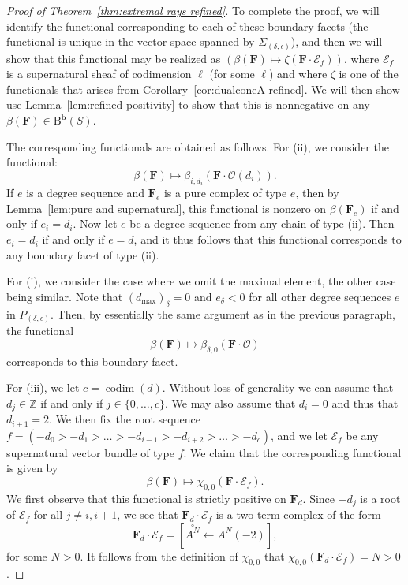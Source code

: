 \documentclass[12pt]{amsart}
\theoremstyle{definition}
\theoremstyle{remark}
\newcommand{\codim}{\operatorname{codim}}
\newcommand{\ZZ}{\mathbb{Z}}
\newcommand{\bb}{\mathbf{b}}
\newcommand{\cO}{\mathcal{O}}
\newcommand{\cE}{\mathcal{E}}
\newcommand{\FF}{\mathbf{F}}
\newcommand{\BBQ}{\mathrm{B}}
\begin{document}
\begin{proof}[Proof of Theorem~\ref{thm:extremal rays refined}]
To complete the proof, we will identify the functional corresponding to each of these boundary facets (the functional is unique in the vector space spanned by $\Sigma_{(\delta,\epsilon)}$), and then we will show that this functional may be realized as $(\beta(\FF)\mapsto \zeta(\FF\cdot \cE_f))$, where $\cE_f$ is a supernatural sheaf of codimension $\ell$ (for some $\ell$) and where $\zeta$ is one of the functionals that arises from Corollary~\ref{cor:dualconeA refined}.   We will then show use Lemma~\ref{lem:refined positivity} to show that  this is nonnegative on any $\beta(\FF)\in \BBQ^{\bb}(S)$.


The corresponding functionals are obtained as follows.  For (ii), we consider the functional:
\[
\beta(\FF)\mapsto \beta_{i,{d_i}}(\FF\cdot \cO(d_i)).
\]
If $e$ is a degree sequence and $\FF_e$ is a pure complex of type $e$, then by Lemma~\ref{lem:pure and supernatural}, this functional is nonzero on $\beta(\FF_e)$ if and only if $e_i=d_i$.
Now let $e$ be a degree sequence from any chain of type (ii).  Then $e_i=d_i$ if and only if $e=d$, and it thus follows that this functional corresponds to any boundary facet of type (ii).

For (i), we consider the case where we omit the maximal element, the other case being similar.  Note that $(d_{\max})_{\delta}=0$ and $e_{\delta}<0$ for all other degree sequences $e$ in $P_{(\delta,\epsilon)}$.  Then, by essentially the same argument as in the previous paragraph, the functional 
\[
\beta(\FF)\mapsto \beta_{\delta,0}(\FF\cdot \cO)
\]
corresponds to this boundary facet.

For (iii), we let $c=\codim(d)$.  Without loss of generality we can assume that $d_j\in \ZZ$ if and only if $j\in \{0, \dots, c\}$.   We may also assume that $d_i=0$ and thus that $d_{i+1}=2$.  We then fix the root sequence $f=(-d_0>-d_1>\dots >-d_{i-1}>-d_{i+2}>\dots >-d_{c})$, and we let $\cE_f$ be any supernatural vector bundle of type $f$.  We claim that the corresponding functional is given by
\[
\beta(\FF) \mapsto \chi_{0,0}(\FF\cdot \cE_f).
\]
We first observe that this functional is strictly positive on $\FF_d$.  Since $-d_j$ is a root of $\cE_f$ for all $j\ne i,i+1$, we see that $\FF_d\cdot \cE_f$ is a two-term complex of the form
\[
\FF_d\cdot \cE_f=\left[ \overset{\circ}{A^N} \gets A^N(-2)\right],
\]
for some $N>0$.  It follows from the definition of $\chi_{0,0}$ that $\chi_{0,0}(\FF_d\cdot \cE_f)=N>0$.  


\end{proof}
\end{document}
